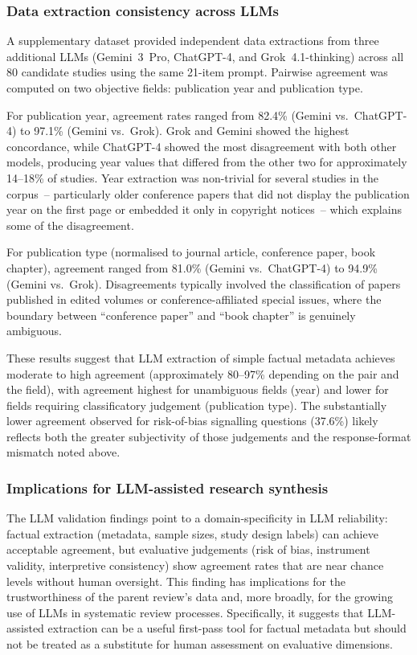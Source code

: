\documentclass[etq]{acnsart}
\begin{document}
	\subsubsection{Data extraction consistency across LLMs}
	\label{sec:results_rq5_extraction}
	
	A supplementary dataset provided independent data extractions from three additional LLMs (Gemini~3~Pro, ChatGPT-4, and Grok~4.1-thinking) across all 80 candidate studies using the same 21-item prompt. Pairwise agreement was computed on two objective fields: publication year and publication type.
	
	For publication year, agreement rates ranged from 82.4\% (Gemini vs.\ ChatGPT-4) to 97.1\% (Gemini vs.\ Grok). Grok and Gemini showed the highest concordance, while ChatGPT-4 showed the most disagreement with both other models, producing year values that differed from the other two for approximately 14--18\% of studies. Year extraction was non-trivial for several studies in the corpus~-- particularly older conference papers that did not display the publication year on the first page or embedded it only in copyright notices~-- which explains some of the disagreement.
	
	For publication type (normalised to journal article, conference paper, book chapter), agreement ranged from 81.0\% (Gemini vs.\ ChatGPT-4) to 94.9\% (Gemini vs.\ Grok). Disagreements typically involved the classification of papers published in edited volumes or conference-affiliated special issues, where the boundary between ``conference paper'' and ``book chapter'' is genuinely ambiguous.
	
	These results suggest that LLM extraction of simple factual metadata achieves moderate to high agreement (approximately 80--97\% depending on the pair and the field), with agreement highest for unambiguous fields (year) and lower for fields requiring classificatory judgement (publication type). The substantially lower agreement observed for risk-of-bias signalling questions (37.6\%) likely reflects both the greater subjectivity of those judgements and the response-format mismatch noted above.
	
	\subsubsection{Implications for LLM-assisted research synthesis}
	
	The LLM validation findings point to a domain-specificity in LLM reliability: factual extraction (metadata, sample sizes, study design labels) can achieve acceptable agreement, but evaluative judgements (risk of bias, instrument validity, interpretive consistency) show agreement rates that are near chance levels without human oversight. This finding has implications for the trustworthiness of the parent review's data and, more broadly, for the growing use of LLMs in systematic review processes. Specifically, it suggests that LLM-assisted extraction can be a useful first-pass tool for factual metadata but should not be treated as a substitute for human assessment on evaluative dimensions.
	
\end{document}
